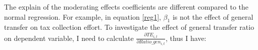 

The explain of the moderating effects coefficients are different compared to the normal regression. For example, in equation \ref{reg1}, $\beta_1$ is not the effect of general transfer on tax collection effort. To investigate the effect of general transfer ratio on dependent variable, I need to calculate $\frac{\partial TE_{i,t}}{\partial Ratio\_gen_{i,t}}$, thus I have:

